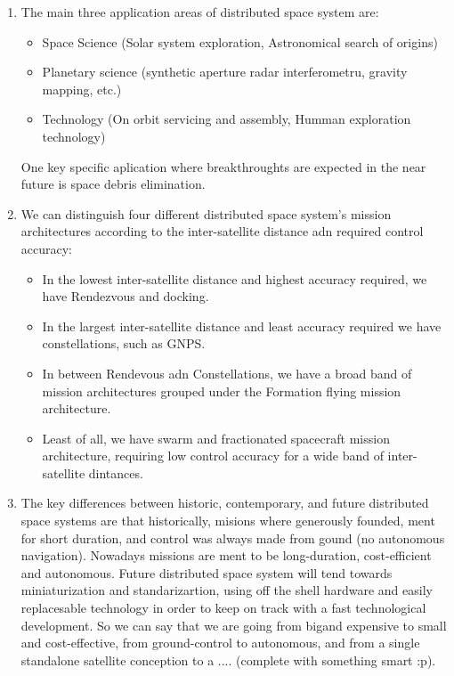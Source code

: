 \documentclass[a4paper]{article}
\begin{document}
\begin{enumerate}[label=\emph{\alph*)},series=preguntas1_1]
  \item The main three application areas of distributed space system are:
  \begin{itemize}
    \item Space Science (Solar system exploration, Astronomical search of origins)
    \item Planetary science (synthetic aperture radar interferometru, gravity mapping, etc.)
    \item Technology (On orbit servicing and assembly, Humman exploration technology)
  \end{itemize}
  One key specific aplication where breakthroughts are expected in the near future is space debris elimination.
  \item We can distinguish four different distributed space system's  mission architectures according to the inter-satellite distance adn required control accuracy:
  \begin{itemize}
    \item In the lowest inter-satellite distance and highest accuracy required, we have Rendezvous and docking.
    \item In the largest inter-satellite distance and least accuracy required we have constellations, such as GNPS.
    \item In between Rendevous adn Constellations, we have a broad band of mission architectures grouped under the Formation flying mission architecture.
    \item Least of all, we have swarm and fractionated spacecraft mission architecture, requiring low control accuracy for a wide band of inter-satellite dintances.
  \end{itemize}

  \item The key differences between historic, contemporary, and future distributed space systems are that historically, misions where generously founded, ment for short duration, and control was always made from gound (no autonomous navigation). Nowadays missions are ment to be long-duration, cost-efficient and autonomous. Future distributed space system will tend towards miniaturization and standarizartion, using off the shell hardware and easily replacesable technology in order to keep on track with a fast technological development. So we can say that we are going from bigand expensive to small and cost-effective, from ground-control to autonomous, and from a single standalone satellite conception to a .... (complete with something smart :p).


\end{enumerate}
\end{document}
